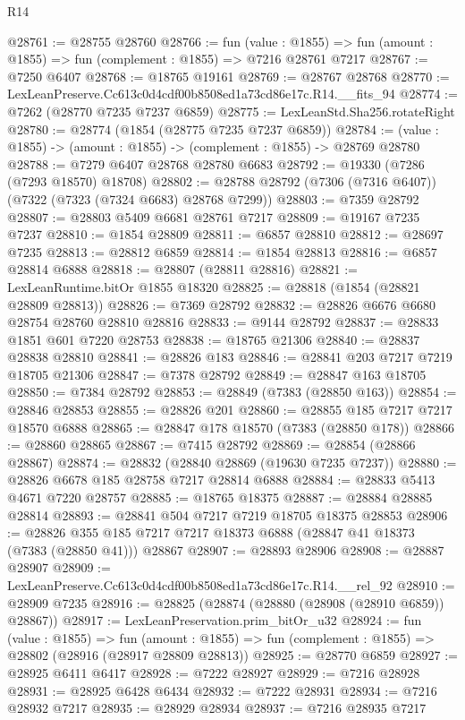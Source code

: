 \begin{lexlean}{R14}
\begin{coremodule}
@28761 := @28755 @28760
@28766 := fun (value : @1855) =>
  fun (amount : @1855) => fun (complement : @1855) => @7216 @28761 @7217
@28767 := @7250 @6407
@28768 := @18765 @19161
@28769 := @28767 @28768
@28770 := LexLeanPreserve.Cc613c0d4cdf00b8508ed1a73cd86e17c.R14.__fits_94
@28774 := @7262 (@28770 @7235 @7237 @6859)
@28775 := LexLeanStd.Sha256.rotateRight
@28780 := @28774 (@1854 (@28775 @7235 @7237 @6859))
@28784 := (value : @1855) -> (amount : @1855) -> (complement : @1855) -> @28769 @28780
@28788 := @7279 @6407 @28768 @28780 @6683
@28792 := @19330 (@7286 (@7293 @18570) @18708)
@28802 := @28788 @28792 (@7306 (@7316 @6407)) (@7322 (@7323 (@7324 @6683) @28768 @7299))
@28803 := @7359 @28792
@28807 := @28803 @5409 @6681 @28761 @7217
@28809 := @19167 @7235 @7237
@28810 := @1854 @28809
@28811 := @6857 @28810
@28812 := @28697 @7235
@28813 := @28812 @6859
@28814 := @1854 @28813
@28816 := @6857 @28814 @6888
@28818 := @28807 (@28811 @28816)
@28821 := LexLeanRuntime.bitOr @1855 @18320
@28825 := @28818 (@1854 (@28821 @28809 @28813))
@28826 := @7369 @28792
@28832 := @28826 @6676 @6680 @28754 @28760 @28810 @28816
@28833 := @9144 @28792
@28837 := @28833 @1851 @601 @7220 @28753
@28838 := @18765 @21306
@28840 := @28837 @28838 @28810
@28841 := @28826 @183
@28846 := @28841 @203 @7217 @7219 @18705 @21306
@28847 := @7378 @28792
@28849 := @28847 @163 @18705
@28850 := @7384 @28792
@28853 := @28849 (@7383 (@28850 @163))
@28854 := @28846 @28853
@28855 := @28826 @201
@28860 := @28855 @185 @7217 @7217 @18570 @6888
@28865 := @28847 @178 @18570 (@7383 (@28850 @178))
@28866 := @28860 @28865
@28867 := @7415 @28792
@28869 := @28854 (@28866 @28867)
@28874 := @28832 (@28840 @28869 (@19630 @7235 @7237))
@28880 := @28826 @6678 @185 @28758 @7217 @28814 @6888
@28884 := @28833 @5413 @4671 @7220 @28757
@28885 := @18765 @18375
@28887 := @28884 @28885 @28814
@28893 := @28841 @504 @7217 @7219 @18705 @18375 @28853
@28906 := @28826 @355 @185 @7217 @7217 @18373 @6888 (@28847 @41 @18373 (@7383 (@28850 @41))) @28867
@28907 := @28893 @28906
@28908 := @28887 @28907
@28909 := LexLeanPreserve.Cc613c0d4cdf00b8508ed1a73cd86e17c.R14.__rel_92
@28910 := @28909 @7235
@28916 := @28825 (@28874 (@28880 (@28908 (@28910 @6859)) @28867))
@28917 := LexLeanPreservation.prim_bitOr_u32
@28924 := fun (value : @1855) =>
  fun (amount : @1855) => fun (complement : @1855) => @28802 (@28916 (@28917 @28809 @28813))
@28925 := @28770 @6859
@28927 := @28925 @6411 @6417
@28928 := @7222 @28927
@28929 := @7216 @28928
@28931 := @28925 @6428 @6434
@28932 := @7222 @28931
@28934 := @7216 @28932 @7217
@28935 := @28929 @28934
@28937 := @7216 @28935 @7217

\end{coremodule}
\end{lexlean}

